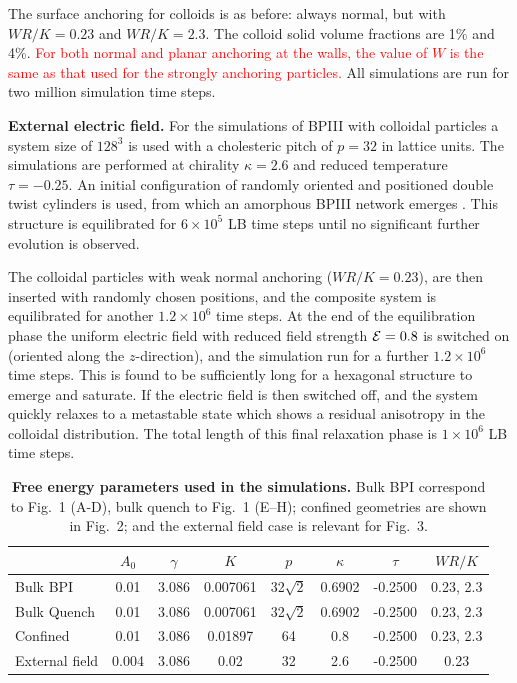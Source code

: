 \documentclass[12pt,twoside]{article}
\begin{document}
The surface anchoring for colloids is as before: always normal, but with
$WR/K = 0.23$ and $WR/K = 2.3$. The colloid solid volume fractions are
1\% and 4\%.
\textcolor{red}{For both normal and planar anchoring at the walls,
the value of $W$ is the same as that used for the strongly anchoring
particles.}
All simulations are run for two million simulation time steps.

\noindent
\textbf{External electric field.}
For the simulations of BPIII with colloidal particles a system size of
$128^3$ is used with a cholesteric pitch of $p=32$ in lattice units. 
The simulations are
performed at chirality $\kappa=2.6$ and reduced temperature $\tau=-0.25$.  
An initial configuration of
randomly oriented and positioned double twist cylinders is used,
from which an amorphous BPIII network emerges \cite{oliver-bp3}. This structure
is equilibrated for $6\times10^{5}$ LB time steps until no significant
further evolution is observed. 

The colloidal particles with weak
normal anchoring ($WR / K= 0.23$), are then inserted with randomly chosen positions,
and the composite system is equilibrated for another $1.2\times10^{6}$
time steps.
At the end of the equilibration phase the uniform electric field
with reduced field strength ${\cal E} = 0.8$ 
is switched on (oriented along the $z$-direction), and the simulation
run for a further $1.2\times10^{6}$ time steps.
This is found to be sufficiently long for a hexagonal structure to
emerge and saturate.
If the electric field is then switched off, and the system quickly relaxes
to a metastable state which shows a residual anisotropy in the
colloidal distribution. The total length of this final relaxation phase
is $1\times10^6$ LB time steps.

\begin{table}[h]
\begin{center}
\begin{tabular}{|l|c|c|c|c|c|c|c|}
\hline
         & $A_0$ & $\gamma$ & $K$ & $p$ & $\kappa$ & $\tau$ & $WR/K$\\
\hline 
Bulk BPI & 0.01 & 3.086 & 0.007061 & 32$\sqrt{2}$ & 0.6902 & -0.2500 &
0.23, 2.3\\
\hline
Bulk Quench & 0.01 & 3.086 & 0.007061 & 32$\sqrt{2}$ & 0.6902 & -0.2500 &
0.23, 2.3 \\
\hline
Confined & 0.01 & 3.086 & 0.01897 & 64 & 0.8 & -0.2500 & 0.23, 2.3\\
\hline
External field & 0.004& 3.086 & 0.02 & 32 & 2.6 & -0.2500 & 0.23\\ 
\hline
\end{tabular}
\end{center}
\caption{\textbf{Free energy parameters used in the simulations.} Bulk BPI
correspond to Fig.~1 (A-D), bulk quench to Fig.~1 (E--H); confined
geometries are shown in Fig.~2; and the external field case is
relevant for Fig.~3.}
\label{table:params}
\end{table}
\end{document}
